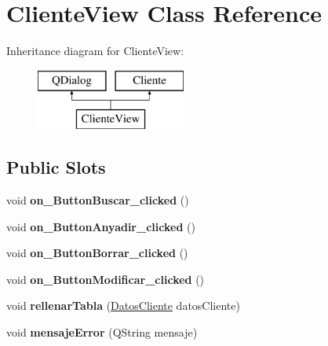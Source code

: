 \hypertarget{classClienteView}{}\section{Cliente\+View Class Reference}
\label{classClienteView}
Inheritance diagram for Cliente\+View\+:\begin{figure}[H]
\begin{center}
\leavevmode
\includegraphics[height=2.000000cm]{classClienteView}
\end{center}
\end{figure}
\subsection*{Public Slots}
\begin{DoxyCompactItemize}
\item 
\mbox{\label{classClienteView_a019ace8139d2b8b8a6d216f0d73729b2}} 
void {\bfseries on\+\_\+\+Button\+Buscar\+\_\+clicked} ()
\item 
\mbox{\label{classClienteView_a0fd9487638e7a19206b7e8104c6fa313}} 
void {\bfseries on\+\_\+\+Button\+Anyadir\+\_\+clicked} ()
\item 
\mbox{\label{classClienteView_ab97e9def1d5d5b61da2802be534c1eff}} 
void {\bfseries on\+\_\+\+Button\+Borrar\+\_\+clicked} ()
\item 
\mbox{\label{classClienteView_ab812b664d6b71ef9d062e2ee62d27bee}} 
void {\bfseries on\+\_\+\+Button\+Modificar\+\_\+clicked} ()
\item 
\mbox{\label{classClienteView_a1a429418d9b58d0417290d29e9a4d731}} 
void {\bfseries rellenar\+Tabla} (\mbox{\hyperlink{structDatosCliente}{Datos\+Cliente}} datos\+Cliente)
\item 
\mbox{\label{classClienteView_ab192c2118f7c1a6a86683298bafb6537}} 
void {\bfseries mensaje\+Error} (Q\+String mensaje)
\end{DoxyCompactItemize}
